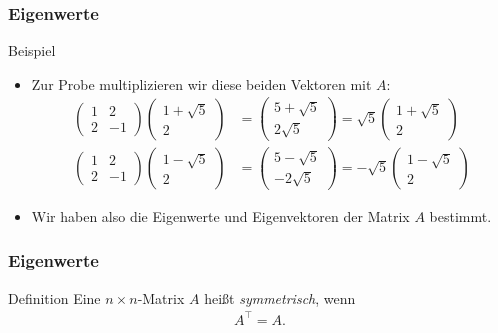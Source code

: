 \documentclass{beamer}
\renewcommand{\emph}[1]{{\textcolor{solarizedRed}{\itshape #1}}}
\newcommand{\trans}{\top}
\newcommand{\mytitle}{Eigenwerte}
\begin{document}
\begin{frame}\frametitle{\mytitle}
	\begin{block}{Beispiel}
	\begin{itemize}
		\item Zur Probe multiplizieren wir diese beiden Vektoren mit $A$:
			\begin{align*}
				\begin{pmatrix}1&2\\2&-1\end{pmatrix}\begin{pmatrix} 1+\sqrt 5\\2 \end{pmatrix}&= \begin{pmatrix} 5+\sqrt 5\\2\sqrt 5 \end{pmatrix}=\sqrt 5\begin{pmatrix} 1+\sqrt 5\\2 \end{pmatrix}\\
				\begin{pmatrix}1&2\\2&-1\end{pmatrix}\begin{pmatrix} 1-\sqrt 5\\2 \end{pmatrix}&= \begin{pmatrix} 5-\sqrt 5\\-2\sqrt 5 \end{pmatrix}=-\sqrt 5\begin{pmatrix} 1-\sqrt 5\\2 \end{pmatrix}
			\end{align*}
		\item Wir haben also die Eigenwerte und Eigenvektoren der Matrix $A$ bestimmt.
	\end{itemize}
	\end{block}
\end{frame}

\begin{frame}\frametitle{\mytitle}
	\begin{block}{Definition}
		Eine $n\times n$-Matrix $A$ hei\ss t \emph{symmetrisch}, wenn
		\begin{align*}
		A^\trans=A.
		\end{align*}
	\end{block}
\end{frame}
\end{document}
